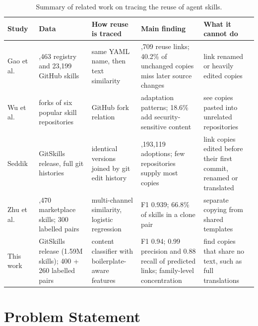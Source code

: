 \documentclass[sigconf,screen]{acmart}
\begin{document}
\begin{table}[t]
\caption{Summary of related work on tracing the reuse of agent skills.}
\label{tab:related}
\small
\begin{tabular}{>{\raggedright\arraybackslash}p{}>{\raggedright\arraybackslash}p{}>{\raggedright\arraybackslash}p{}>{\raggedright\arraybackslash}p{}>{\raggedright\arraybackslash}p{}}
\toprule
Study & Data & How reuse is traced & Main finding & What it cannot do \\
\midrule
Gao et al.~\cite{gao2026registry} & 18,463 registry and 23,199 GitHub skills & same YAML name, then text similarity & 3,709 reuse links; 40.2\% of unchanged copies miss later source changes & link renamed or heavily edited copies \\
Wu et al.~\cite{wu2026adaptation} & forks of six popular skill repositories & GitHub fork relation & 46 adaptation patterns; 18.6\% add security-sensitive content & see copies pasted into unrelated repositories \\
Seddik~\cite{seddik2026constellations} & GitSkills release, full git histories & identical versions joined by git edit history & 2,193,119 adoptions; few repositories supply most copies & link copies edited before their first commit, renamed or translated \\
Zhu et al.~\cite{zhu2026skillreuse} & 137,470 marketplace skills; 300 labelled pairs & multi-channel similarity, logistic regression & F1 0.939; 66.8\% of skills in a clone pair & separate copying from shared templates \\
This work & GitSkills release (1.59M skills); 400 + 260 labelled pairs & content classifier with boilerplate-aware features & F1 0.94; 0.99 precision and 0.88 recall of predicted links; family-level concentration & find copies that share no text, such as full translations \\
\bottomrule
\end{tabular}
\end{table}


\section{Problem Statement}
\label{Section:Problem}
\end{document}

